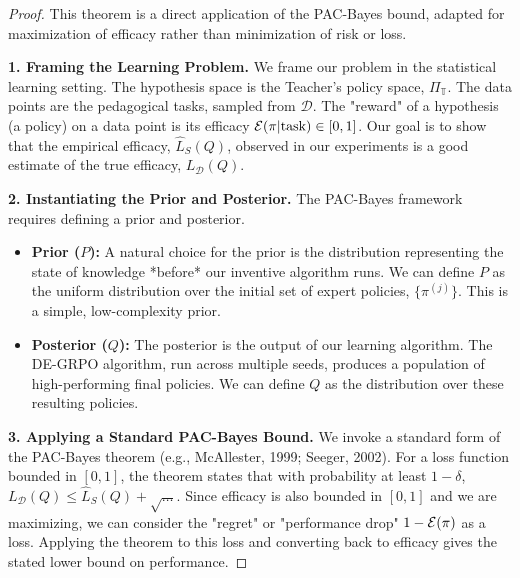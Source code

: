 \begin{proof}
This theorem is a direct application of the PAC-Bayes bound, adapted for maximization of efficacy rather than minimization of risk or loss.

\noindent\textbf{1. Framing the Learning Problem.}
We frame our problem in the statistical learning setting. The hypothesis space is the Teacher's policy space, $\Pi_{\mathbb{T}}$. The data points are the pedagogical tasks, sampled from $\mathcal{D}$. The "reward" of a hypothesis (a policy) on a data point is its efficacy $\mathcal{E}(\pi | \text{task}) \in [0, 1]$. Our goal is to show that the empirical efficacy, $\hat{L}_S(Q)$, observed in our experiments is a good estimate of the true efficacy, $L_{\mathcal{D}}(Q)$.

\noindent\textbf{2. Instantiating the Prior and Posterior.}
The PAC-Bayes framework requires defining a prior and posterior.
\begin{itemize}
    \item \textbf{Prior ($P$):} A natural choice for the prior is the distribution representing the state of knowledge *before* our inventive algorithm runs. We can define $P$ as the uniform distribution over the initial set of expert policies, $\{\pi^{(j)}\}$. This is a simple, low-complexity prior.
    \item \textbf{Posterior ($Q$):} The posterior is the output of our learning algorithm. The DE-GRPO algorithm, run across multiple seeds, produces a population of high-performing final policies. We can define $Q$ as the distribution over these resulting policies.
\end{itemize}

\noindent\textbf{3. Applying a Standard PAC-Bayes Bound.}
We invoke a standard form of the PAC-Bayes theorem (e.g., McAllester, 1999; Seeger, 2002). For a loss function bounded in $[0,1]$, the theorem states that with probability at least $1-\delta$, $L_{\mathcal{D}}(Q) \le \hat{L}_S(Q) + \sqrt{\dots}$. Since efficacy is also bounded in $[0,1]$ and we are maximizing, we can consider the "regret" or "performance drop" $1-\mathcal{E}(\pi)$ as a loss. Applying the theorem to this loss and converting back to efficacy gives the stated lower bound on performance.


\end{proof}
